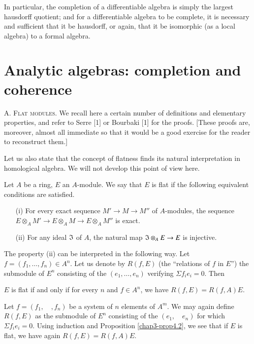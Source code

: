In particular, the completion of a differentiable algebra is simply the largest hausdorff quotient; and for a differentiable algebra to be complete, it is necessary and sufficient that it be hausdorff, or again, that it be isomorphic (as a local algebra) to a formal algebra.

\section{Analytic algebras: completion and coherence}\label{chap3-sec4}

A. \textsc{Flat modules.} We recall here a certain number of definitions and elementary properties, and refer to Serre [1] or Bourbaki [1] for the proofs. [These proofs are, moreover, almost all immediate so that it would be a good exercise for the reader to reconstruct them.]

Let us also state that the concept of flatness finds its natural interpretation in homological algebra. We will not develop this point of view here.

\begin{definition}\label{chap3-defi4.1}
Let $A$ be a ring, $E$ an $A$-module. We say that $E$ is flat if the following equivalent conditions are satisfied.
\begin{itemize}
\item[\rm(i)] For every exact sequence $M'\to M\to M''$ of $A$-modules, the sequence $E\otimes_{A}M'\to E\otimes_{A}M\to E\otimes_{A}M''$ is exact.

\item[\rm(ii)] For any ideal $\mathfrak{I}$ of $A$, the natural map $\mathfrak{I}\otimes_{A}E\to E$ is injective.
\end{itemize}
\end{definition}

The property (ii) can be interpreted in the following way. Let $f=(f_{1},\ldots,f_{n})\in A^{n}$. Let us denote by $R(f,E)$ (the ``relations of $f$ in $E$'') the submodule of $E^{n}$ consisting of the $(e_{1},\ldots,e_{n})$ verifying $\Sigma f_{i}e_{i}=0$. Then

\begin{proposition}\label{chap3-prop4.2}
$E$ is flat if and only if for every $n$ and $f\in A^{n}$, we have $R(f,E)=R(f,A)E$.
\end{proposition}

\begin{remark}\label{chap3-rem4.3}
Let $f=(f_{1},\quad,f_{n})$ be a system of $n$ elements of $A^{m}$. We may again define $R(f,E)$ as the submodule of $E^{n}$ consisting of the $(e_{1},\quad e_{n})$ for which $\Sigma f_{i}e_{i}=0$. Using induction and Proposition \ref{chap3-prop4.2}, we see that if $E$ is flat, we have again $R(f,E)=R(f,A)E$.
\end{remark}

